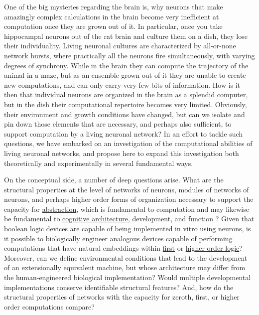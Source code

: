 One of the big mysteries regarding the brain is, why neurons that make amazingly complex calculations in the brain become very inefficient at computation once they are grown out of it. In particular, once you take hippocampal neurons out of the rat brain and culture them on a dish, they lose their individuality. Living neuronal cultures are characterized by all-or-none network bursts, where practically all the neurons fire simultaneously, with varying degrees of synchrony. While in the brain they can compute the trajectory of the animal in a maze, but as an ensemble grown out of it they are unable to create new computations, and can only carry very few bits of information. How is it then that individual neurons are organized in the brain as a splendid computer, but in the dish their computational repertoire becomes very limited. Obviously, their environment and growth conditions have changed, but can we isolate and pin down those elements that are necessary, and perhaps also sufficient, to support computation by a living neuronal network? In an effort to tackle such questions, we have embarked on an investigation of the computational abilities of living neuronal networks, and propose here to expand this investigation both theoretically and experimentally in several fundamental ways.

On the conceptual side, a number of deep questions arise. What are the structural properties at the level of networks of neurons,
modules of networks of neurons, and perhaps higher order forms of
organization necessary to support the capacity for
\href{http://en.wikipedia.org/wiki/Metalinguistic\_abstraction}{abstraction},
which is fundamental to computation and may likewise be fundamental to
\href{http://en.wikipedia.org/wiki/Cognitive\_architecture}{cognitive
architecture}, development, and function \cite{Tenenbaum2011}? Given that boolean
logic devices are capable of being implemented in vitro using
neurons\cite{Feinerman2008}, is it possible to biologically engineer analogous
devices capable of performing computations that have natural embeddings
within \href{http://en.wikipedia.org/wiki/First-order\_logic}{first} or
\href{http://en.wikipedia.org/wiki/Higher\_order\_logic}{higher order
logic}? Moreover, can we define environmental conditions that lead to
the development of an extensionally equivalent machine, but whose
architecture may differ from the human-engineered biological
implementation? Would multiple developmental implementations conserve
identifiable structural features? And, how do the structural properties
of networks with the capacity for zeroth, first, or higher order
computations compare?

